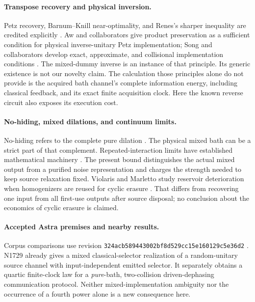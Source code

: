 \documentclass[11pt]{article}
\numberwithin{equation}{section}
\theoremstyle{remark}
\begin{document}
\paragraph{Transpose recovery and physical inversion.}
Petz recovery, Barnum--Knill near-optimality, and Renes's sharper inequality
are credited explicitly \cite{BarnumKnill,Renes}. Aw and collaborators give
product preservation as a sufficient condition for physical inverse-unitary
Petz implementation; Song and collaborators develop exact, approximate, and
collisional implementation conditions \cite{Aw,Song}.
The mixed-dummy inverse is an instance of that principle. Its generic
existence is not our novelty claim. The calculation those principles alone
do not provide is the acquired bath channel's complete information energy,
including classical feedback, and its exact finite acquisition clock.
Here the known reverse circuit also exposes its execution cost.

\paragraph{No-hiding, mixed dilations, and continuum limits.}
No-hiding refers to the complete pure dilation \cite{BraunsteinPati}.
The physical mixed bath can be a strict part of that complement.
Repeated-interaction limits have established mathematical machinery
\cite{AttalPautrat}. The present bound distinguishes the actual mixed output
from a purified noise representation and charges the strength needed to
keep source relaxation fixed.
Violaris and Marletto study reservoir deterioration when homogenizers are
reused for cyclic erasure \cite{Violaris}. That differs from recovering one
input from all first-use outputs after source disposal; no conclusion about
the economics of cyclic erasure is claimed.

\paragraph{Accepted Astra premises and nearby results.}
Corpus comparisons use revision
\texttt{324acb589443002bf8d529cc15e160129c5e36d2}
\cite{AstraMarkov,AstraExtreme,AstraCollector}.
N1729 already gives a mixed classical-selector realization of a
random-unitary source channel with input-independent emitted selector.
It separately obtains a quartic finite-clock law for a \emph{pure}-bath,
two-collision driven-dephasing communication protocol. Neither
mixed-implementation ambiguity nor the occurrence of a fourth power alone
is a new consequence here.
\end{document}
